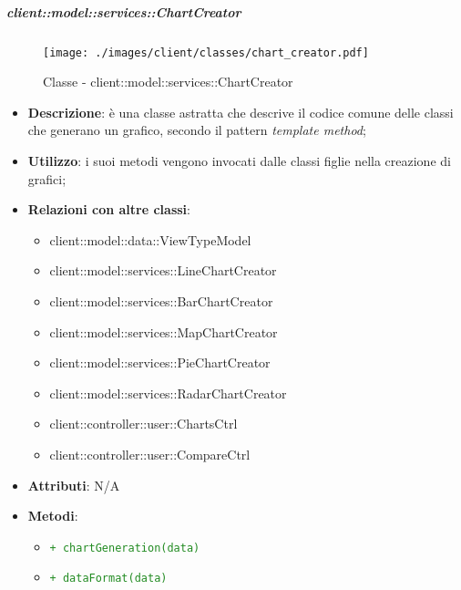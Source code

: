 		\subparagraph{client::model::services::ChartCreator} %
		\label{subp:chartcreator}
			\begin{figure}[htbp]
				\centering
				\centerline{\texttt{[image: ./images/client/classes/chart\_creator.pdf]}}
				\caption{Classe - client::model::services::ChartCreator}
			\end{figure}
			\begin{itemize}
				\item \textbf{Descrizione}: è una classe astratta che descrive il codice comune delle classi che generano un grafico, secondo il pattern \emph{template method};
				\item \textbf{Utilizzo}: i suoi metodi vengono invocati dalle classi figlie nella creazione di grafici;
				\item \textbf{Relazioni con altre classi}:
					\begin{itemize}
						\item client::model::data::ViewTypeModel
						\item client::model::services::LineChartCreator
						\item client::model::services::BarChartCreator
						\item client::model::services::MapChartCreator
						\item client::model::services::PieChartCreator
						\item client::model::services::RadarChartCreator
						\item client::controller::user::ChartsCtrl
						\item client::controller::user::CompareCtrl
					\end{itemize}
				\item \textbf{Attributi}: N/A
				\item \textbf{Metodi}: 
					\begin{itemize}
						\item \textcolor{forestgreen}{\texttt{+ chartGeneration(data)}}
						\item \textcolor{forestgreen}{\texttt{+ dataFormat(data)}}

					\end{itemize}
			\end{itemize}

